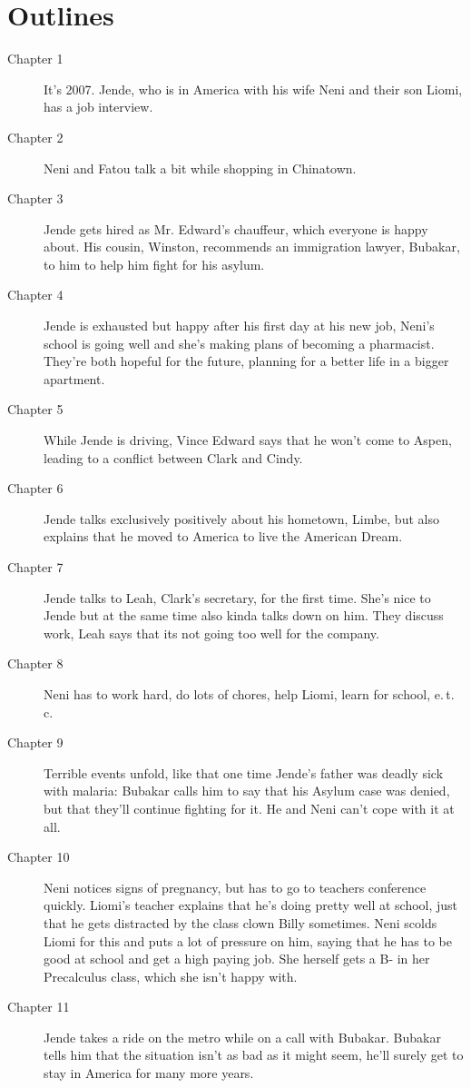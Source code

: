 \documentclass{article}
\begin{document}
\section*{Outlines} 
\begin{description}
 \item[Chapter 1] It's 2007. Jende, who is in America with his wife Neni and their son Liomi, has a job interview.
 \item[Chapter 2] Neni and Fatou talk a bit while shopping in Chinatown.
 \item[Chapter 3] Jende gets hired as Mr. Edward's chauffeur, which everyone is happy about. His cousin, Winston, recommends an immigration lawyer, Bubakar, to him to help him fight for his asylum.
 \item[Chapter 4] Jende is exhausted but happy after his first day at his new job, Neni's school is going well and she's making plans of becoming a pharmacist. They're both hopeful for the future, planning for a better life in a bigger apartment.
 \item[Chapter 5] While Jende is driving, Vince Edward says that he won't come to Aspen, leading to a conflict between Clark and Cindy.
 \item[Chapter 6] Jende talks exclusively positively about his hometown, Limbe, but also explains that he moved to America to live the American Dream.
 \item[Chapter 7] Jende talks to Leah, Clark's secretary, for the first time. She's nice to Jende but at the same time also kinda talks down on him. They discuss work, Leah says that its not going too well for the company. 
 \item[Chapter 8] Neni has to work hard, do lots of chores, help Liomi, learn for school, e.\,t.\,c. 
 \item[Chapter 9] Terrible events unfold, like that one time Jende's father was deadly sick with malaria: Bubakar calls him to say that his Asylum case was denied, but that they'll continue fighting for it. He and Neni can't cope with it at all.
 \item[Chapter 10] Neni notices signs of pregnancy, but has to go to teachers conference quickly. Liomi's teacher explains that he's doing pretty well at school, just that he gets distracted by the class clown Billy sometimes. Neni scolds Liomi for this and puts a lot of pressure on him, saying that he has to be good at school and get a high paying job. She herself gets a B- in her Precalculus class, which she isn't happy with.
 \item[Chapter 11] Jende takes a ride on the metro while on a call with Bubakar. Bubakar tells him that the situation isn't as bad as it might seem, he'll surely get to stay in America for many more years.

\end{description}
\end{document}
